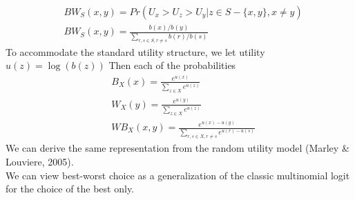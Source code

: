 \documentclass[mksc,blindrev]{informs3} %
\begin{document}
\begin{align*}
&BW_S(x,y)=Pr(U_x>U_z>U_y | z \in S -\{x,y\}, x\neq y)\\
&BW_S(x,y)=\frac{b(x)/b(y)}{\sum_{r,s \in S, r \neq s}b(r)/b(s)}
\end{align*}
To accommodate the standard utility structure, we let utility $u(z)=\log{(b(z))}$ Then each of the probabilities 
\begin{align*}
&B_X(x)=\frac{e^{u(x)}}{\sum_{z \in X} e^{u(z)}}\\
&W_X(y)=\frac{e^{u(y)}}{\sum_{z \in X} e^{u(z)}}\\
&WB_X(x,y)=\frac{e^{u(x)-u(y)}}{\sum_{r,s \in X, r\neq s} e^{u(r)-u(s)}}
\end{align*}
We can derive the same representation from the random utility model (Marley \& Louviere, 2005). \\
We can view best-worst choice as a generalization of the classic multinomial logit for the choice of the best only.\\
\end{document}
